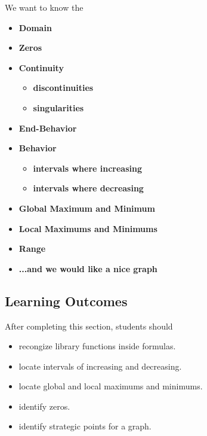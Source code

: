 \documentclass{ximera}
\begin{document}
We want to know the 
\begin{itemize}
     \item \textbf{\textcolor{red!80!black}{Domain}} 
     \item \textbf{\textcolor{red!80!black}{Zeros}} 
     \item \textbf{\textcolor{red!80!black}{Continuity}} 
\begin{itemize}
     \item \textbf{\textcolor{purple!85!blue}{discontinuities}} 
     \item \textbf{\textcolor{purple!85!blue}{singularities}} 
\end{itemize}
     \item \textbf{\textcolor{red!80!black}{End-Behavior}} 
     \item \textbf{\textcolor{red!80!black}{Behavior}} 
\begin{itemize}
     \item \textbf{\textcolor{purple!85!blue}{intervals where increasing}} 
     \item \textbf{\textcolor{purple!85!blue}{intervals where decreasing}} 
\end{itemize}
     \item \textbf{\textcolor{red!80!black}{Global Maximum and Minimum}} 
     \item \textbf{\textcolor{red!80!black}{Local Maximums and Minimums}} 
     \item \textbf{\textcolor{red!80!black}{Range}} 
     \item \textbf{\textcolor{blue!55!black}{...and we would like a nice graph}} 
\end{itemize}











\subsection*{Learning Outcomes}

\begin{sectionOutcomes}
After completing this section, students should 

\begin{itemize}
\item recongize library functions inside formulas.
\item locate intervals of increasing and decreasing.
\item locate global and local maximums and minimums.
\item identify zeros.
\item identify strategic points for a graph.
\end{itemize}
\end{sectionOutcomes}
\end{document}
